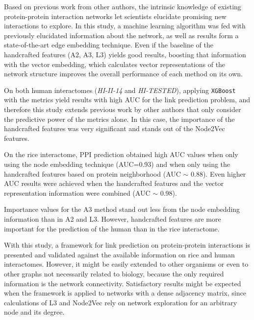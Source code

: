 Based on previous work from other authors\cite{Kovacs2019}, the intrinsic
knowledge of existing protein-protein interaction networks let scientists
elucidate promising new interactions to explore. In this study, a
machine learning algorithm was fed with previously elucidated information
about the network, as well as results form a state-of-the-art edge
embedding technique. Even if the baseline of the handcrafted features
(A2, A3, L3) yields good results, boosting that information with the
vector embedding, which calculates vector representations of the network
structure improves the overall performance of each method on its own.

On both human interactomes (\emph{HI-II-14} and \emph{HI-TESTED}),
applying \texttt{XGBoost} with the metrics yield results with high
AUC for the link prediction problem, and therefore this study extends
previous work by other authors that only consider the predictive power
of the metrics alone. In this case, the importance of the handcrafted
features was very significant and stands out of the Node2Vec features.

On the rice interactome, PPI prediction obtained high AUC values when
only using the node embedding technique (AUC=0.93) and when only using
the handcrafted features based on protein neighborhood (AUC $\sim$ 0.88).
Even higher AUC results were achieved when the handcrafted features
and the vector representation information were combined (AUC $\sim$ 0.98).

Importance values for the A3 method stand out less from the node embedding
information than in A2 and L3. However, handcrafted features are more
important for the prediction of the human than in the rice interactome. 

With this study, a framework for link prediction on protein-protein
interactions is presented and validated against the available information
on rice and human interactomes. However, it might be easily extended
to other organisms or even to other graphs not necessarily related
to biology, because the only required information is the network connectivity.
Satisfactory results might be expected when the framework is applied
to networks with a dense adjacency matrix, since calculations of L3
and Node2Vec rely on network exploration for an arbitrary node and
its degree.
